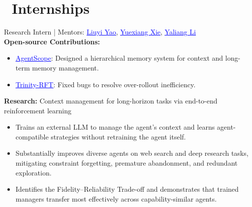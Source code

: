 \documentclass{resume}
\begin{document}
\section{\faCogs\ Internships}
Research Intern | Mentors: \href{https://osier-yi.github.io/}{\textcolor{blue}{\underline{Liuyi Yao}}}, \href{https://xieyxclack.github.io/}{\textcolor{blue}{\underline{Yuexiang Xie}}}, \href{https://sites.google.com/site/yaliangli/}{\textcolor{blue}{\underline{Yaliang Li}}} \\
{\bf Open-source Contributions:}
\begin{itemize}
  \item \href{https://github.com/agentscope-ai/agentscope}{\textcolor{blue}{\underline{AgentScope}}}: Designed a hierarchical memory system for context and long-term memory management.
  \item \href{https://github.com/modelscope/trinity-rft}{\textcolor{blue}{\underline{Trinity-RFT}}}: Fixed bugs to resolve over-rollout inefficiency.
\end{itemize}
{\bf Research:} Context management for long-horizon tasks via end-to-end reinforcement learning
\begin{itemize}
  \item Trains an external LLM to manage the agent's context and learns agent-compatible strategies without retraining the agent itself.
  \item Substantially improves diverse agents on web search and deep research tasks, mitigating constraint forgetting, premature abandonment, and redundant exploration.
  \item Identifies the Fidelity--Reliability Trade-off and demonstrates that trained managers transfer most effectively across capability-similar agents.
\end{itemize}
\end{document}
